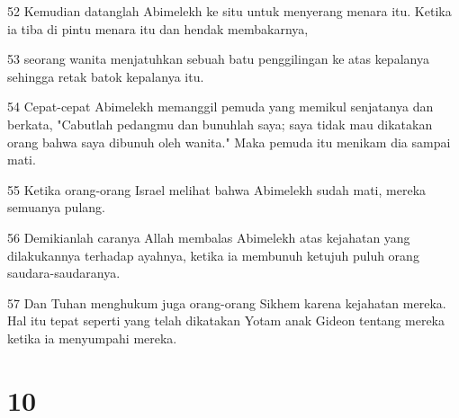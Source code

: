 \par 52 Kemudian datanglah Abimelekh ke situ untuk menyerang menara itu. Ketika ia tiba di pintu menara itu dan hendak membakarnya,
\par 53 seorang wanita menjatuhkan sebuah batu penggilingan ke atas kepalanya sehingga retak batok kepalanya itu.
\par 54 Cepat-cepat Abimelekh memanggil pemuda yang memikul senjatanya dan berkata, "Cabutlah pedangmu dan bunuhlah saya; saya tidak mau dikatakan orang bahwa saya dibunuh oleh wanita." Maka pemuda itu menikam dia sampai mati.
\par 55 Ketika orang-orang Israel melihat bahwa Abimelekh sudah mati, mereka semuanya pulang.
\par 56 Demikianlah caranya Allah membalas Abimelekh atas kejahatan yang dilakukannya terhadap ayahnya, ketika ia membunuh ketujuh puluh orang saudara-saudaranya.
\par 57 Dan Tuhan menghukum juga orang-orang Sikhem karena kejahatan mereka. Hal itu tepat seperti yang telah dikatakan Yotam anak Gideon tentang mereka ketika ia menyumpahi mereka.

\chapter{10}

